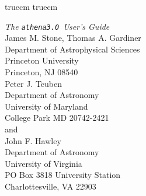 \nonstopmode
{}

\setlength{\textheight}{9.0in}
\setlength{\textwidth}{6.5in}
 truecm
 truecm

\newcommand{\SEP}[1]{\setlength{\fboxsep}{#1pt}}
\newsavebox{\Qbox}
\newenvironment{Ebox}{\hspace*{.1in}%
\begin{lrbox}{\Qbox}%
\begin{minipage}[t]{4.4in}\it\sffamily}%
{\end{minipage}%
\end{lrbox}\vspace{6pt}\SEP{6}%
\fbox{\usebox{\Qbox}}\vspace{6pt}\SEP{3}}



\newcommand{\ath}{{\tt athena3.0}}
\newcommand{\Dx}[0]{\bigtriangleup x}

\makeatletter                                            %
\def\plotone#1{\centering \leavevmode                    %
\epsfxsize=\columnwidth \epsfbox{#1}}                    %
\def\plotone_reduction#1#2{\centering \leavevmode        %
\epsfxsize=#2\columnwidth \epsfbox{#1}}                  %
\def\plottwo#1#2{\centering \leavevmode                  %
\epsfxsize=.45\columnwidth \epsfbox{#1} \hfil            %
\epsfxsize=.45\columnwidth \epsfbox{#2}}                 %
\def\plotfiddle#1#2#3#4#5#6#7{\centering \leavevmode     %
\vbox to#2{\rule{0pt}{#2}}                               %
\special{psfile=#1 voffset=#7 hoffset=#6 vscale=#5 hscale=#4 angle=#3}} %
\makeatother




\begin{center}
{\huge {\it The \ath\ User's Guide }} \vspace{1in} \\
{\Large James M. Stone, Thomas A. Gardiner} \\
{\large Department of Astrophysical Sciences \\ Princeton University \\
Princeton, NJ 08540} \vspace{0.5in} \\
{\Large Peter J. Teuben} \\
{\large Department of Astronomy \\ University of
Maryland \\ College Park MD 20742-2421} \vspace{0.5in} \\
and \vspace{0.5in} \\
{\Large John F. Hawley} \\
{\large Department of Astronomy \\ University of
Virginia \\ PO Box 3818 University Station \\ Charlottesville, VA 22903} \vspace{1in} \\
\end{center}
\newpage

